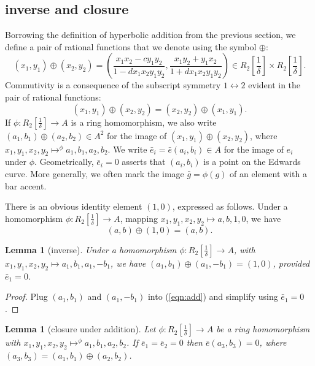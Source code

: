 \documentclass[12pt]{article}
\newtheorem{lemma}[theorem]{Lemma}
\newcommand{\f}[1]{\frac{1}{#1}}
\begin{document}
\subsection{inverse and closure}

Borrowing the definition of hyperbolic addition from the previous
section, we define a pair of rational functions that we denote using
the symbol $\oplus$:
\begin{equation}\label{eqn:add}
(x_1,y_1) \oplus (x_2,y_2) =  \left(\frac{x_1 x_2 - c y_1 y_2}{1 - d x_1 x_2 y_1 y_2},
\frac{x_1 y_2 + y_1 x_2}{1+d x_1 x_2 y_1 y_2}\right) \in R_2[\f{\delta}]\times R_2[\f{\delta}].
\end{equation}
Commutivity is a consequence of the subscript symmetry
$1\leftrightarrow 2$ evident in the pair of rational functions:
\[
(x_1,y_1) \oplus (x_2,y_2) = (x_2,y_2) \oplus (x_1,y_1).
\]
If $\phi:R_2[\f{\delta}]\to A$ is a ring homomorphism, we also write
$(a_1,b_1)\oplus (a_2,b_2)\in A^2$ for the image of $(x_1,y_1)\oplus
(x_2,y_2)$, where $x_1,y_1,x_2,y_2 \mapsto^\phi a_1,b_1,a_2,b_2$.  We
write $\bar e_i=\bar e(a_i,b_i)\in A$ for the image of $e_i$ under
$\phi$.  Geometrically, $\bar e_i=0$ asserts that $(a_i,b_i)$ is a
point on the Edwards curve.  More generally, we often mark the image
$\bar g=\phi(g)$ of an element with a bar accent.

There is an obvious identity element $(1,0)$, expressed as follows.
Under a homomorphism $\phi:R_2[\f{\delta}]\to A$, mapping
$x_1,y_1,x_2,y_2\mapsto a,b,1,0$, we have 
\begin{equation}
(a,b)\oplus(1,0) = (a,b).
\end{equation}

\begin{lemma} [inverse] 
  Under a homomorphism $\phi:R_2[\f{\delta}]\to A$, with
  $x_1,y_1,x_2,y_2\mapsto a_1,b_1,a_1,-b_1$, we have $(a_1,b_1)\oplus
  (a_1,-b_1) = (1,0)$, provided $\bar e_1=0$.
\end{lemma}

\begin{proof} Plug $(a_1,b_1)$ and $(a_1,-b_1)$ into (\ref{eqn:add})
  and simplify using $\bar e_1=0$.
\end{proof}

\begin{lemma}[closure under addition]\label{lemma:closure}
  Let $\phi:R_2[\f{\delta}]\to A$ be a ring homomorphism with
  $x_1,y_1,x_2,y_2 \mapsto^\phi a_1,b_1,a_2,b_2$.  If $\bar e_1 = \bar
  e_2 = 0$ then ${\bar e}(a_3,b_3) = 0$, where $(a_3,b_3) =
  (a_1,b_1)\oplus (a_2,b_2)$.
\end{lemma}
\end{document}
